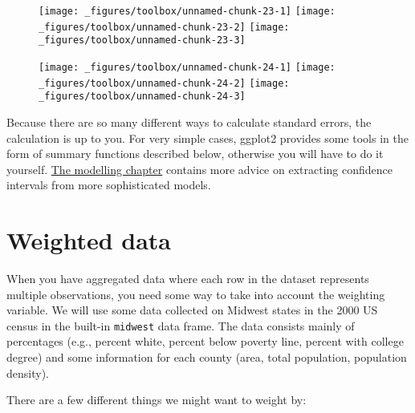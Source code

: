 \begin{figure}[H]
  \texttt{[image: \_figures/toolbox/unnamed-chunk-23-1]}%
  \texttt{[image: \_figures/toolbox/unnamed-chunk-23-2]}%
  \texttt{[image: \_figures/toolbox/unnamed-chunk-23-3]}
\end{figure}

\begin{Shaded}
\begin{Highlighting}[]
\StringTok{ }\NormalTok{()}
\StringTok{ }\NormalTok{()}
\StringTok{ }\NormalTok{()}
\end{Highlighting}
\end{Shaded}

\begin{figure}[H]
  \texttt{[image: \_figures/toolbox/unnamed-chunk-24-1]}%
  \texttt{[image: \_figures/toolbox/unnamed-chunk-24-2]}%
  \texttt{[image: \_figures/toolbox/unnamed-chunk-24-3]}
\end{figure}

Because there are so many different ways to calculate standard errors,
the calculation is up to you.  For very simple
cases, ggplot2 provides some tools in the form of summary functions
described below, otherwise you will have to do it yourself.
\protect\hyperlink{cha:modelling}{The modelling chapter} contains more
advice on extracting confidence intervals from more sophisticated
models.

\hypertarget{sec:weighting}{\section{Weighted
data}\label{sec:weighting}}

When you have aggregated data where each row in the dataset represents
multiple observations, you need some way to take into account the
weighting variable. We will use some data collected on Midwest states in
the 2000 US census in the built-in \texttt{midwest} data frame. The data
consists mainly of percentages (e.g., percent white, percent below
poverty line, percent with college degree) and some information for each
county (area, total population, population density). 

There are a few different things we might want to weight by:

